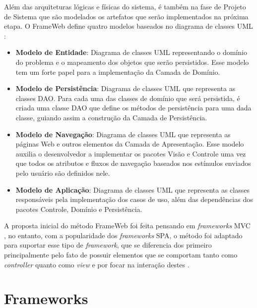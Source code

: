 Além das arquiteturas lógicas e físicas do sistema, é também na fase de Projeto de Sistema
que são modelados os artefatos que serão implementados na próxima etapa. O FrameWeb define
quatro modelos baseados no diagrama de classes UML \cite{souza:2007,souza:2020}:


\begin{itemize}
    \item \textbf{Modelo de Entidade}: Diagrama de classes UML representando o domínio do 
        problema e o mapeamento dos objetos que serão persistidos. Esse modelo tem um forte
        papel para a implementação da Camada de Domínio.

    \item \textbf{Modelo de Persistência}: Diagrama de classes UML que representa as classes
        DAO. Para cada uma das classes de domínio que será persistida, é criada uma classe DAO
        que define os métodos de persistência para uma dada classe, guiando assim a 
        construção da Camada de Persistência.
    
    \item \textbf{Modelo de Navegação}: Diagrama de classes UML que representa as páginas Web
        e outros elementos da Camada de Apresentação. Esse modelo auxilia o desenvolvedor a
        implementar os pacotes Visão e Controle uma vez que todos os atributos e fluxos de 
        navegação baseados nos estímulos enviados pelo usuário são definidos nele. 

    \item \textbf{Modelo de Aplicação}: Diagrama de classes UML que representa as classes
        responsáveis pela implementação dos casos de uso, além das dependências dos pacotes
        Controle, Domínio e Persistência.
\end{itemize}

A proposta inicial do método FrameWeb foi feita pensando em \textit{frameworks} MVC \cite{souza:2007}, 
no entanto, com a popularidade dos \textit{frameworks} SPA, o método foi adaptado para suportar
esse tipo de \textit{framework}, que se diferencia dos primeiro principalmente pelo fato de possuir elementos que se comportam tanto como \textit{controller} quanto como 
\textit{view} e por focar na interação destes \cite{hoppe:2023}.


\section{Frameworks}
\label{sec-fundteo-framework}

